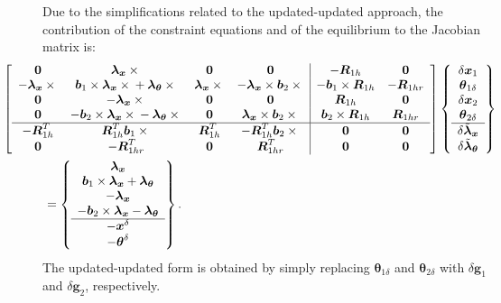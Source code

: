 \documentclass[10pt,dvips,fleqn]{report}
\newcommand{\T}[1]{\boldsymbol{#1}}
\begin{document}
Due to the simplifications related to the updated-updated approach,
the contribution of the constraint equations and of the equilibrium 
to the Jacobian matrix is: 
\begin{align}
	\small
	&\hspace{-12mm}%
	\sqbr{\matr{cccc|cc}{
	\T{0} & 
	\T{\lambda}_{\T{x}}\times{} & 
	\T{0} & 
	\T{0} & 
	-\T{R}_{1h} &
	\T{0} \\
	-\T{\lambda}_{\T{x}}\times{} & 
	\T{b}_1\times\T{\lambda}_{\T{x}}\times{} + \T{\lambda}_{\T{\theta}}\times{} &
	\T{\lambda}_{\T{x}}\times{} & 
	-\T{\lambda}_{\T{x}}\times\T{b}_2\times{} & 
	-\T{b}_1\times\T{R}_{1h} &
	-\T{R}_{1hr} \\
	\T{0} & 
	-\T{\lambda}_{\T{x}}\times{} &
	\T{0} &
	\T{0} &
	\T{R}_{1h} &
	\T{0} \\
	\T{0} & 
	-\T{b}_2\times\T{\lambda}_{\T{x}}\times{} - \T{\lambda}_{\T{\theta}}\times{} &
	\T{0} &
	\T{\lambda}_{\T{x}}\times\T{b}_2\times{} &
	\T{b}_2\times\T{R}_{1h} & 
	\T{R}_{1hr} \\
	\hline
	-\T{R}_{1h}^T &
	\T{R}_{1h}^T\T{b}_1\times{} & 
	\T{R}_{1h}^T &
	-\T{R}_{1h}^T\T{b}_2\times{} & 
	\T{0} &
	\T{0} \\
	\T{0} &
	-\T{R}_{1hr}^T &
	\T{0} &
	\T{R}_{1hr}^T &
	\T{0} & 
	\T{0}
	}} \cubr{\cvvect{
		\delta\T{x}_1 \\
		\T{\theta}_{1\delta} \\
		\delta\T{x}_2 \\
		\T{\theta}_{2\delta} \\
		\hline
		\delta\tilde{\T{\lambda}}_{\T{x}} \\
		\delta\tilde{\T{\lambda}}_{\T{\theta}}
	}} \nonumber \\
	&= \cubr{\cvvect{
	\T{\lambda}_{\T{x}} \\
	\T{b}_1 \times \T{\lambda}_{\T{x}} + \T{\lambda}_{\T{\theta}} \\
	- \T{\lambda}_{\T{x}} \\
	- \T{b}_2 \times \T{\lambda}_{\T{x}} - \T{\lambda}_{\T{\theta}} \\
	\hline
	- \T{x}^{\delta} \\
	- \T{\theta}^{\delta}
	}} .
\end{align}
The updated-updated form is obtained by simply replacing
$\T{\theta}_{1\delta}$ and $\T{\theta}_{2\delta}$
with $\delta\T{g}_1$ and $\delta\T{g}_2$, respectively.
\end{document}
